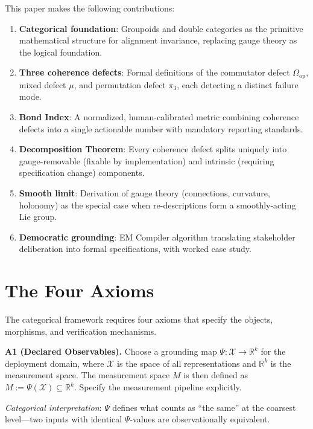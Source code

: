 \documentclass[12pt]{article}
\begin{document}
This paper makes the following contributions:
\begin{enumerate}
    \item \textbf{Categorical foundation}: Groupoids and double categories as the primitive mathematical structure for alignment invariance, replacing gauge theory as the logical foundation.
    \item \textbf{Three coherence defects}: Formal definitions of the commutator defect $\Omega_{\mathrm{op}}$, mixed defect $\mu$, and permutation defect $\pi_3$, each detecting a distinct failure mode.
    \item \textbf{Bond Index}: A normalized, human-calibrated metric combining coherence defects into a single actionable number with mandatory reporting standards.
    \item \textbf{Decomposition Theorem}: Every coherence defect splits uniquely into gauge-removable (fixable by implementation) and intrinsic (requiring specification change) components.
    \item \textbf{Smooth limit}: Derivation of gauge theory (connections, curvature, holonomy) as the special case when re-descriptions form a smoothly-acting Lie group.
    \item \textbf{Democratic grounding}: EM Compiler algorithm translating stakeholder deliberation into formal specifications, with worked case study.
\end{enumerate}

\section{The Four Axioms}

The categorical framework requires four axioms that specify the objects, morphisms, and verification mechanisms.

\textbf{A1 (Declared Observables).} Choose a grounding map $\Psi\colon \mathcal{X} \to \mathbb{R}^k$ for the deployment domain, where $\mathcal{X}$ is the space of all representations and $\mathbb{R}^k$ is the measurement space. The measurement space $M$ is then defined as $M := \Psi(\mathcal{X}) \subseteq \mathbb{R}^k$. Specify the measurement pipeline explicitly.

\emph{Categorical interpretation}: $\Psi$ defines what counts as ``the same'' at the coarsest level---two inputs with identical $\Psi$-values are observationally equivalent.
\end{document}
